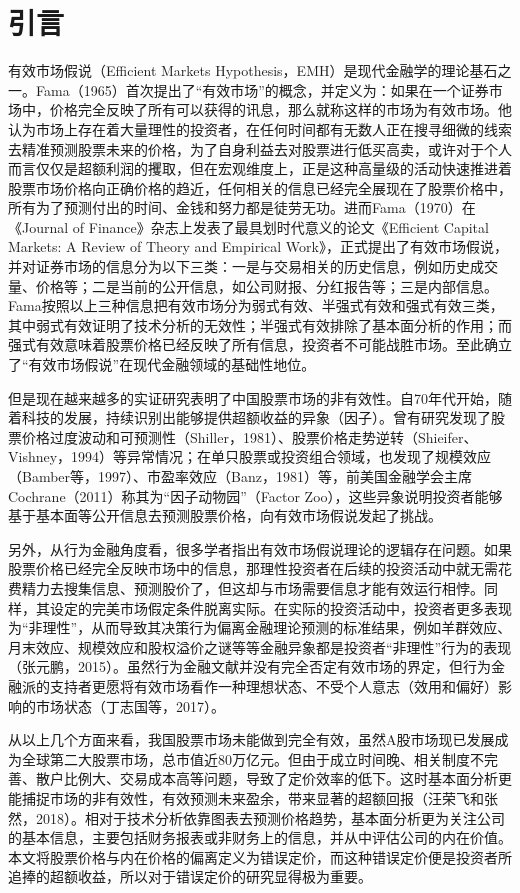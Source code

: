 
\chapter{引言}
有效市场假说（Efficient Markets Hypothesis，EMH）是现代金融学的理论基石之一。Fama（1965）首次提出了“有效市场”的概念，并定义为：如果在一个证券市场中，价格完全反映了所有可以获得的讯息，那么就称这样的市场为有效市场。他认为市场上存在着大量理性的投资者，在任何时间都有无数人正在搜寻细微的线索去精准预测股票未来的价格，为了自身利益去对股票进行低买高卖，或许对于个人而言仅仅是超额利润的攫取，但在宏观维度上，正是这种高量级的活动快速推进着股票市场价格向正确价格的趋近，任何相关的信息已经完全展现在了股票价格中，所有为了预测付出的时间、金钱和努力都是徒劳无功。进而Fama（1970）在《Journal of Finance》杂志上发表了最具划时代意义的论文《Efficient Capital Markets: A Review of Theory and Empirical Work》，正式提出了有效市场假说，并对证券市场的信息分为以下三类：一是与交易相关的历史信息，例如历史成交量、价格等；二是当前的公开信息，如公司财报、分红报告等；三是内部信息。Fama按照以上三种信息把有效市场分为弱式有效、半强式有效和强式有效三类，其中弱式有效证明了技术分析的无效性；半强式有效排除了基本面分析的作用；而强式有效意味着股票价格已经反映了所有信息，投资者不可能战胜市场。至此确立了“有效市场假说”在现代金融领域的基础性地位。

但是现在越来越多的实证研究表明了中国股票市场的非有效性。自70年代开始，随着科技的发展，持续识别出能够提供超额收益的异象（因子）。曾有研究发现了股票价格过度波动和可预测性（Shiller，1981）、股票价格走势逆转（Shieifer、Vishney，1994）等异常情况；在单只股票或投资组合领域，也发现了规模效应（Bamber等，1997）、市盈率效应（Banz，1981）等，前美国金融学会主席Cochrane（2011）称其为“因子动物园”（Factor Zoo），这些异象说明投资者能够基于基本面等公开信息去预测股票价格，向有效市场假说发起了挑战。

另外，从行为金融角度看，很多学者指出有效市场假说理论的逻辑存在问题。如果股票价格已经完全反映市场中的信息，那理性投资者在后续的投资活动中就无需花费精力去搜集信息、预测股价了，但这却与市场需要信息才能有效运行相悖。同样，其设定的完美市场假定条件脱离实际。在实际的投资活动中，投资者更多表现为“非理性”，从而导致其决策行为偏离金融理论预测的标准结果，例如羊群效应、月末效应、规模效应和股权溢价之谜等等金融异象都是投资者“非理性”行为的表现（张元鹏，2015）。虽然行为金融文献并没有完全否定有效市场的界定，但行为金融派的支持者更愿将有效市场看作一种理想状态、不受个人意志（效用和偏好）影响的市场状态（丁志国等，2017）。

从以上几个方面来看，我国股票市场未能做到完全有效，虽然A股市场现已发展成为全球第二大股票市场，总市值近80万亿元。但由于成立时间晚、相关制度不完善、散户比例大、交易成本高等问题，导致了定价效率的低下。这时基本面分析更能捕捉市场的非有效性，有效预测未来盈余，带来显著的超额回报（汪荣飞和张然，2018）。相对于技术分析依靠图表去预测价格趋势，基本面分析更为关注公司的基本信息，主要包括财务报表或非财务上的信息，并从中评估公司的内在价值。本文将股票价格与内在价格的偏离定义为错误定价，而这种错误定价便是投资者所追捧的超额收益，所以对于错误定价的研究显得极为重要。

